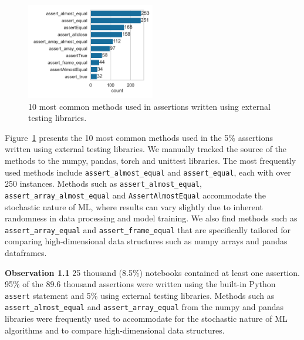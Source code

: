 \documentclass[smallextended]{svjour3}       %
\newcommand{\highlight}[1]{\begin{framed}%
  \noindent#1
\end{framed}}
\providecommand{\DIFaddbegin}{} %
\providecommand{\DIFaddend}{} %
\providecommand{\DIFdelbegin}{} %
\providecommand{\DIFdelend}{} %
\newcommand{\DIFscaledelfig}{0.5}
\newlength{\DIFdelgraphicswidth} %
\newlength{\DIFdelgraphicsheight} %
\newcommand{\DIFaddincludegraphics}[2][]{{\color{blue}\fbox{\DIFOincludegraphics[#1]{#2}}}} %
\newcommand{\DIFdelincludegraphics}[2][]{%
\sbox{\DIFdelgraphicsbox}{\DIFOincludegraphics[#1]{#2}}%
\settoboxwidth{\DIFdelgraphicswidth}{\DIFdelgraphicsbox} %
\settoboxtotalheight{\DIFdelgraphicsheight}{\DIFdelgraphicsbox} %
\scalebox{\DIFscaledelfig}{%
\parbox[b]{\DIFdelgraphicswidth}{\usebox{\DIFdelgraphicsbox}\\[-\baselineskip] \rule{\DIFdelgraphicswidth}{0em}}\llap{\resizebox{\DIFdelgraphicswidth}{\DIFdelgraphicsheight}{%
\setlength{\unitlength}{\DIFdelgraphicswidth}%
\begin{picture}(1,1)%
\thicklines\linethickness{2pt} %
{\color[rgb]{1,0,0}\put(0,0){\framebox(1,1){}}}%
{\color[rgb]{1,0,0}\put(0,0){\line( 1,1){1}}}%
{\color[rgb]{1,0,0}\put(0,1){\line(1,-1){1}}}%
\end{picture}%
}\hspace*{3pt}}} %
} %
\DeclareRobustCommand{\DIFaddbegin}{\DIFOaddbegin \let\includegraphics\DIFaddincludegraphics} %
\DeclareRobustCommand{\DIFaddend}{\DIFOaddend \let\includegraphics\DIFOincludegraphics} %
\DeclareRobustCommand{\DIFdelbegin}{\DIFOdelbegin \let\includegraphics\DIFdelincludegraphics} %
\DeclareRobustCommand{\DIFdelend}{\DIFOaddend \let\includegraphics\DIFOincludegraphics} %
\begin{document}
\begin{figure}
	\centering
	\includegraphics[width=0.5\textwidth]{other-test-methods.pdf}
	\caption{10 most common methods used in assertions written using external testing libraries.}
	\label{fig:other-test-methods}
\end{figure}

Figure~\ref{fig:other-test-methods} presents the 10 most common methods used in the 5\% assertions written using external testing libraries. We manually tracked the source of the methods to the numpy, pandas, torch and unittest libraries. The most frequently used methods include \lstinline{assert_almost_equal} and \lstinline{assert_equal}, each with over 250 instances. Methods such as \lstinline{assert_almost_equal}, \lstinline{assert_array_almost_equal} and \lstinline{AssertAlmostEqual} accommodate the stochastic nature of ML, where results can vary slightly due to inherent randomness in data processing and model training. We also find methods such as \lstinline{assert_array_equal} and \lstinline{assert_frame_equal} that are specifically tailored for comparing high-dimensional data structures such as numpy arrays and pandas dataframes.

\DIFdelbegin %
\DIFdelend \DIFaddbegin \highlight{\textbf{Observation 1.1} 25 thousand (8.5\%) notebooks contained at least one assertion. 95\% of the 89.6 thousand assertions were written using the built-in Python {\color{blue}%
\lstinline{assert} %
}%
statement and 5\% using external testing libraries. Methods such as {\color{blue}%
\lstinline{assert_almost_equal} %
}%
and {\color{blue}%
\lstinline{assert_array_equal} %
}%
from the numpy and pandas libraries were frequently used to accommodate for the stochastic nature of ML algorithms and to compare high-dimensional data structures.}
\DIFaddend 
\end{document}
